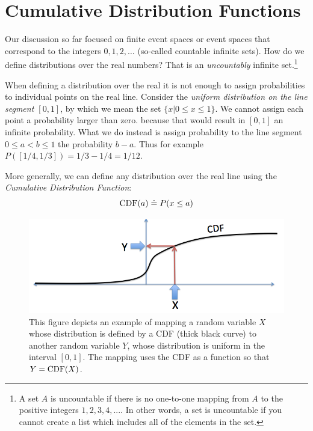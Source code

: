 \section{Cumulative Distribution Functions}

Our discussion so far focused on finite event spaces or event spaces
that correspond to the integers $0,1,2,\ldots$ (so-called countable
infinite sets). How do we define distributions over the real numbers?
That is an {\em uncountably} infinite set.\footnote{A set $A$ is
  uncountable if there is no one-to-one mapping from $A$ to the
  positive integers $1,2,3,4,...$. In other words, a set is
  uncountable if you cannot create a list which includes all of the
  elements in the set.}

When defining a distribution over the real it is not enough to assign
probabilities to individual points on the real line. Consider the {\em
  uniform distribution on the line segment $[0,1]$}, by which
we mean the set $\{x | 0 \leq x \leq 1\}$. We cannot assign each
point a probability larger than zero. because that would result in
$[0,1]$ an infinite probability. What we do instead is assign
probability to the line segment $0 \leq a < b \leq 1$ the probability
$b-a$. Thus for example $P([1/4,1/3])=1/3-1/4 = 1/12$.

More generally, we can define any distribution over the real line
using the {\em Cumulative Distribution Function}:
\[
\mbox{CDF}(a) \doteq P(x \leq a)
\]

\begin{figure}[th]
\begin{center}
\includegraphics[width=5in]{figs/CDFmapping.png}
\end{center}
\caption{This figure depicts an example of mapping a random variable
  $X$ whose distribution is defined by a CDF (thick black curve) to
  another random variable $Y$, whose distribution is uniform in the
  interval $[0,1]$. The mapping uses the CDF as a function so that
  $Y=\mbox{CDF}(X)$. \label{fig:CDFmap}}
\end{figure}

